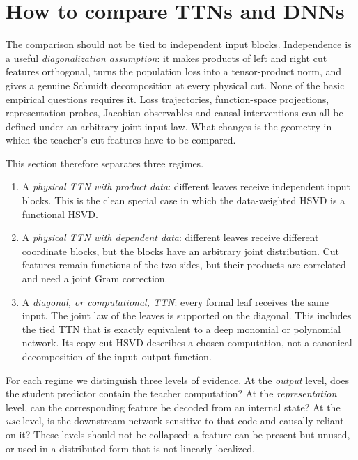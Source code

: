 \section{How to compare TTNs and DNNs}\label{sec:compare}

The comparison should not be tied to independent input blocks.  Independence is a useful
\emph{diagonalization assumption}: it makes products of left and right cut features orthogonal,
turns the population loss into a tensor-product norm, and gives a genuine Schmidt decomposition
at every physical cut.  None of the basic empirical questions requires it.  Loss trajectories,
function-space projections, representation probes, Jacobian observables and causal interventions
can all be defined under an arbitrary joint input law.  What changes is the geometry in which the
teacher's cut features have to be compared.

This section therefore separates three regimes.
\begin{enumerate}[label=(\roman*),nosep]
\item A \emph{physical TTN with product data}: different leaves receive independent input blocks.
      This is the clean special case in which the data-weighted HSVD is a functional HSVD.
\item A \emph{physical TTN with dependent data}: different leaves receive different coordinate
      blocks, but the blocks have an arbitrary joint distribution.  Cut features remain functions
      of the two sides, but their products are correlated and need a joint Gram correction.
\item A \emph{diagonal, or computational, TTN}: every formal leaf receives the same input.  The
      joint law of the leaves is supported on the diagonal.  This includes the tied TTN that is
      exactly equivalent to a deep monomial or polynomial network.  Its copy-cut HSVD describes a
      chosen computation, not a canonical decomposition of the input--output function.
\end{enumerate}

For each regime we distinguish three levels of evidence.  At the \emph{output} level, does the
student predictor contain the teacher computation?  At the \emph{representation} level, can the
corresponding feature be decoded from an internal state?  At the \emph{use} level, is the downstream
network sensitive to that code and causally reliant on it?  These levels should not be collapsed:
a feature can be present but unused, or used in a distributed form that is not linearly localized.

